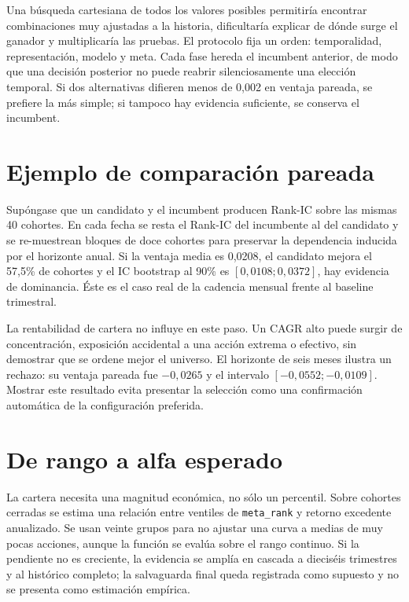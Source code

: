 Una búsqueda cartesiana de todos los valores posibles permitiría encontrar combinaciones muy
ajustadas a la historia, dificultaría explicar de dónde surge el ganador y multiplicaría las
pruebas. El protocolo fija un orden: temporalidad, representación, modelo y meta. Cada fase hereda
el incumbent anterior, de modo que una decisión posterior no puede reabrir silenciosamente una
elección temporal. Si dos alternativas difieren menos de 0,002 en ventaja pareada, se prefiere la
más simple; si tampoco hay evidencia suficiente, se conserva el incumbent.

\section{Ejemplo de comparación pareada}

Supóngase que un candidato y el incumbent producen Rank-IC sobre las mismas 40 cohortes. En cada
fecha se resta el Rank-IC del incumbente al del candidato y se re-muestrean bloques de doce cohortes
para preservar la dependencia inducida por el horizonte anual. Si la ventaja media es 0,0208, el
candidato mejora el 57,5\% de cohortes y el IC bootstrap al 90\% es $[0,0108;0,0372]$, hay evidencia
de dominancia. Éste es el caso real de la cadencia mensual frente al baseline trimestral.

La rentabilidad de cartera no influye en este paso. Un CAGR alto puede surgir de concentración,
exposición accidental a una acción extrema o efectivo, sin demostrar que se ordene mejor el
universo. El horizonte de seis meses ilustra un rechazo: su ventaja pareada fue $-0,0265$ y el
intervalo $[-0,0552;-0,0109]$. Mostrar este resultado evita presentar la selección como una
confirmación automática de la configuración preferida.

\section{De rango a alfa esperado}

La cartera necesita una magnitud económica, no sólo un percentil. Sobre cohortes cerradas se estima
una relación entre ventiles de \texttt{meta\_rank} y retorno excedente anualizado. Se usan veinte
grupos para no ajustar una curva a medias de muy pocas acciones, aunque la función se evalúa sobre
el rango continuo. Si la pendiente no es creciente, la evidencia se amplía en cascada a dieciséis
trimestres y al histórico completo; la salvaguarda final queda registrada como supuesto y no se
presenta como estimación empírica.

